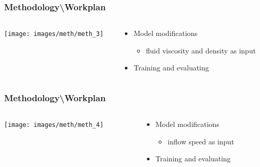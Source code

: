 \documentclass[18pt]{beamer}
\begin{document}
\begin{frame}[t]
  \frametitle{Methodology\textbackslash Workplan}
  \begin{columns}[t]
    \begin{column}{0.35\textwidth}
      \texttt{[image: images/meth/meth\_3]}
    \end{column}
    \begin{column}[t]{0.65\textwidth}
      \vspace*{-7cm}
      \begin{itemize}
      \item Model modifications
        \begin{itemize}
        \item fluid viscosity and density as input
        \end{itemize}
      \item Training and evaluating
      \end{itemize}
    \end{column}
  \end{columns}
\end{frame}


\begin{frame}[t]
  \frametitle{Methodology\textbackslash Workplan}
  \begin{columns}[t]
    \begin{column}{0.35\textwidth}
      \texttt{[image: images/meth/meth\_4]}
    \end{column}
    \begin{column}[t]{0.65\textwidth}
      \vspace*{-7cm}
      \begin{itemize}
      \item Model modifications
        \begin{itemize}
        \item inflow speed as input
        \end{itemize}
      \item Training and evaluating
      \end{itemize}
    \end{column}
  \end{columns}
\end{frame}
\end{document}
